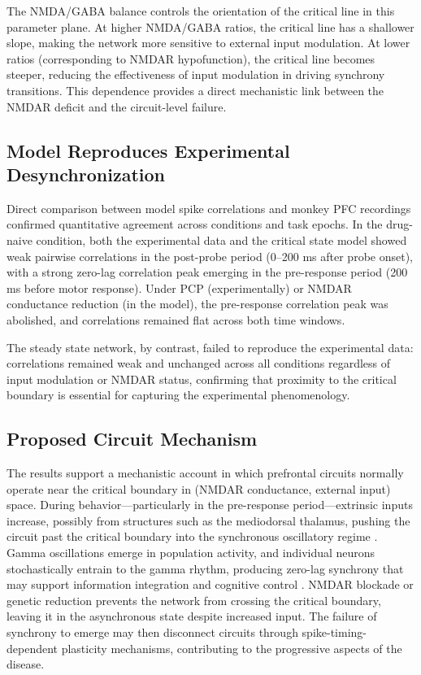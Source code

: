 \documentclass[11pt]{article}
\begin{document}
The NMDA/GABA balance controls the orientation of the critical line in this parameter plane. At higher NMDA/GABA ratios, the critical line has a shallower slope, making the network more sensitive to external input modulation. At lower ratios (corresponding to NMDAR hypofunction), the critical line becomes steeper, reducing the effectiveness of input modulation in driving synchrony transitions. This dependence provides a direct mechanistic link between the NMDAR deficit and the circuit-level failure.

\subsection{Model Reproduces Experimental Desynchronization}

Direct comparison between model spike correlations and monkey PFC recordings confirmed quantitative agreement across conditions and task epochs. In the drug-naive condition, both the experimental data and the critical state model showed weak pairwise correlations in the post-probe period (0--200 ms after probe onset), with a strong zero-lag correlation peak emerging in the pre-response period (200 ms before motor response). Under PCP (experimentally) or NMDAR conductance reduction (in the model), the pre-response correlation peak was abolished, and correlations remained flat across both time windows.

The steady state network, by contrast, failed to reproduce the experimental data: correlations remained weak and unchanged across all conditions regardless of input modulation or NMDAR status, confirming that proximity to the critical boundary is essential for capturing the experimental phenomenology.

\subsection{Proposed Circuit Mechanism}

The results support a mechanistic account in which prefrontal circuits normally operate near the critical boundary in (NMDAR conductance, external input) space. During behavior---particularly in the pre-response period---extrinsic inputs increase, possibly from structures such as the mediodorsal thalamus, pushing the circuit past the critical boundary into the synchronous oscillatory regime \citep{mitchell2014advances}. Gamma oscillations emerge in population activity, and individual neurons stochastically entrain to the gamma rhythm, producing zero-lag synchrony that may support information integration and cognitive control \citep{fries2005mechanism}. NMDAR blockade or genetic reduction prevents the network from crossing the critical boundary, leaving it in the asynchronous state despite increased input. The failure of synchrony to emerge may then disconnect circuits through spike-timing-dependent plasticity mechanisms, contributing to the progressive aspects of the disease.
\end{document}
